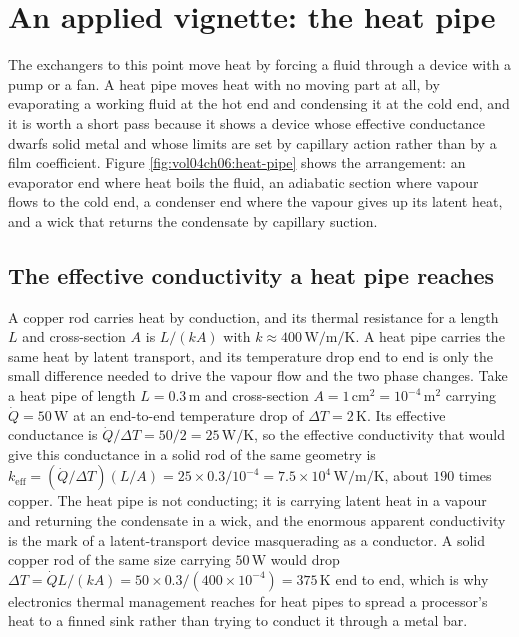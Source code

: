 \section{An applied vignette: the heat pipe}

The exchangers to this point move heat by forcing a fluid through a device with a
pump or a fan. A heat pipe moves heat with no moving part at all, by evaporating a
working fluid at the hot end and condensing it at the cold end, and it is worth a
short pass because it shows a device whose effective conductance dwarfs solid metal
and whose limits are set by capillary action rather than by a film coefficient.
Figure \ref{fig:vol04ch06:heat-pipe} shows the arrangement: an evaporator end
where heat boils the fluid, an adiabatic section where vapour flows to the cold
end, a condenser end where the vapour gives up its latent heat, and a wick that
returns the condensate by capillary suction.



\subsection{The effective conductivity a heat pipe reaches}

A copper rod carries heat by conduction, and its thermal resistance for a length
$L$ and cross-section $A$ is $L/(k A)$ with $k \approx 400\,\si{\watt\per\meter
\per\kelvin}$. A heat pipe carries the same heat by latent transport, and its
temperature drop end to end is only the small difference needed to drive the
vapour flow and the two phase changes. Take a heat pipe of length $L = 0.3\,\text{m}$
and cross-section $A = 1\,\text{cm}^2 = 10^{-4}\,\text{m}^2$ carrying
$\dot{Q} = 50\,\text{W}$ at an end-to-end temperature drop of $\Delta T = 2\,\si{
\kelvin}$. Its effective conductance is $\dot{Q}/\Delta T = 50/2 = 25\,\text{W}/
\si{\kelvin}$, so the effective conductivity that would give this conductance in a
solid rod of the same geometry is $k_{\text{eff}} = (\dot{Q}/\Delta T)(L/A) =
25\times 0.3/10^{-4} = 7.5\times 10^4\,\si{\watt\per\meter\per\kelvin}$, about
$190$ times copper. The heat pipe is not conducting; it is carrying latent heat in
a vapour and returning the condensate in a wick, and the enormous apparent
conductivity is the mark of a latent-transport device masquerading as a
conductor. A solid copper rod of the same size carrying $50\,\text{W}$ would drop
$\Delta T = \dot{Q} L/(k A) = 50\times 0.3/(400\times 10^{-4}) = 375\,\si{\kelvin}$
end to end, which is why electronics thermal management reaches for heat pipes to
spread a processor's heat to a finned sink rather than trying to conduct it through
a metal bar.

